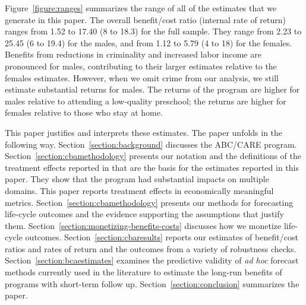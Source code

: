 Figure~\ref{figure:ranges} summarizes the range of all of the estimates that we generate in this paper. The overall benefit/cost ratio (internal rate of return) ranges from 1.52 to 17.40 (8 to 18.3) for the full sample. They range from 2.23 to 25.45 (6 to 19.4) for the males, and from 1.12 to 5.79 (4 to 18) for the females. Benefits from reductions in criminality and increased labor income are pronounced for males, contributing to their larger estimates relative to the females estimates. However, when we omit crime from our analysis, we still estimate substantial returns for males. The returns of the program are higher for males relative to attending a low-quality preschool; the returns are higher for females relative to those who stay at home.

This paper justifies and interprets these estimates. The paper unfolds in the following way. Section~\ref{section:background} discusses the ABC/CARE program. Section~\ref{section:cbamethodology} presents our notation and the definitions of the treatment effects reported in \cite{Garcia_Heckman_Ziff_2017_Gender-Diff_UNPUBLISHED} that are the basis for the estimates reported in this paper. They show that the program had substantial impacts on multiple domains. This paper reports treatment effects in economically meaningful metrics.  Section~\ref{section:cbamethodology} presents our methods for forecasting life-cycle outcomes and the evidence supporting the assumptions that justify them. Section~\ref{section:monetizing-benefits-costs} discusses how we monetize life-cycle outcomes. Section~\ref{section:cbaresults} reports our estimates of benefit/cost ratios and rates of return and the outcomes from a variety of robustness checks. Section~\ref{section:bcaestimates} examines the predictive validity of \emph{ad hoc} forecast methods currently used in the literature to estimate the long-run benefits of programs with short-term follow up. Section~\ref{section:conclusion} summarizes the paper.

